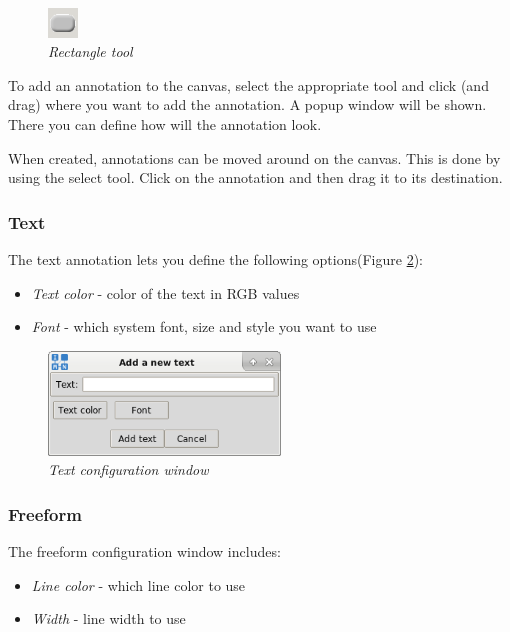 \begin{figure}[H]
  \centering
  \vspace{10pt}
  \includegraphics[width=0.07\textwidth]{./images/rectangle_tool.png}
  \caption{\emph{Rectangle tool}}
  \label{fig:rectangle}
\end{figure}

To add an annotation to the canvas, select the appropriate tool and click (and
drag) where you want to add the annotation. A popup window will be shown. There
you can define how will the annotation look.

When created, annotations can be moved around on the canvas. This is done by
using the select tool. Click on the annotation and then drag it to its
destination.

\subsubsection{Text}
The text annotation lets you define the following options(Figure
\ref{fig:text_conf}):
\begin{itemize}
    \item \emph{Text color} - color of the text in RGB values
    \item \emph{Font} - which system font, size and style you want to use
\end{itemize}

\begin{figure}[H]
	\centering
	\vspace{10pt}
	\includegraphics[width=0.55\textwidth]{./images/text_conf.png}
	\caption{\emph{Text configuration window}}
	\label{fig:text_conf}
\end{figure}

\subsubsection{Freeform}
The freeform configuration window includes:
\begin{itemize}
	\item \emph{Line color} - which line color to use
	\item \emph{Width} - line width to use
\end{itemize}

